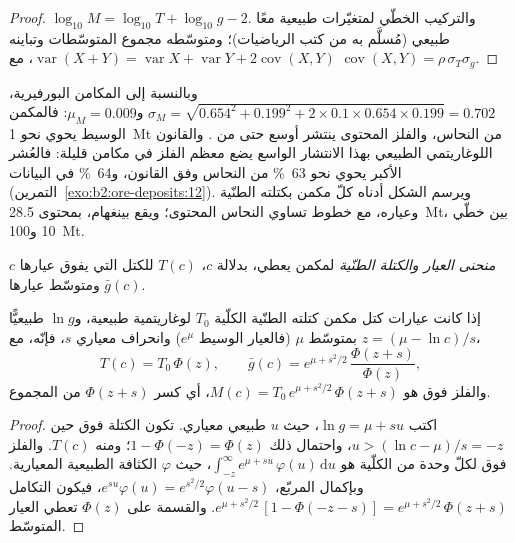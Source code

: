 \begin{proof}
$\log_{10} M = \log_{10} T + \log_{10} g - 2$. والتركيب الخطّي لمتغيّرات طبيعية معًا
طبيعي (مُسلَّم به من كتب الرياضيات)؛ ومتوسّطه مجموع المتوسّطات وتباينه
$\operatorname{var}(X + Y) = \operatorname{var} X + \operatorname{var} Y + 2\operatorname{cov}(X, Y)$،
مع $\operatorname{cov}(X, Y) = \rho\,\sigma_T\sigma_g$.
\end{proof}

وبالنسبة إلى المكامن البورفيرية، $\sigma_M = \sqrt{0.654^2 + 0.199^2 + 2 \times 0.1 \times 0.654 \times
0.199} = 0.702$ و\mbox{$\mu_M = 0.009$}: فالمكمن الوسيط يحوي نحو \qty{1}{Mt} من النحاس،
والفلز المحتوى ينتشر أوسع حتى من . والقانون اللوغاريتمي الطبيعي بهذا الانتشار الواسع
يضع معظم الفلز في مكامن قليلة: فالعُشر الأكبر يحوي نحو \qty{63}{\percent} من
النحاس وفق القانون، و\qty{64}{\percent} في البيانات (التمرين~\ref{exo:b2:ore-deposits:12}). ويرسم
الشكل أدناه كلّ مكمن بكتلته الطنّية وعياره، مع خطوط تساوي النحاس المحتوى؛
ويقع بينغهام، بمحتوى \qty{28.5}{Mt}، بين خطّي 10 و\qty{100}{Mt}.

\begin{definition}\label{def:b2:ore-deposits:gt}
\emph{منحنى العيار والكتلة الطنّية} لمكمن يعطي، بدلالة
 $c$،  $T(c)$ للكتل التي يفوق عيارها $c$ ومتوسّط عيارها
$\bar g(c)$.
\end{definition}

\begin{proposition}\label{prop:b2:ore-deposits:gt}
إذا كانت عيارات كتل مكمن كتلته الطنّية الكلّية $T_0$ لوغاريتمية طبيعية، و$\ln g$ طبيعيًّا
بمتوسّط $\mu$ (فالعيار الوسيط $e^{\mu}$) وانحراف معياري $s$، فإنّه، مع $z = (\mu -
\ln c)/s$،
\begin{equation}
T(c) = T_0\,\Phi(z), \qquad
\bar g(c) = e^{\mu + s^2/2}\,\frac{\Phi(z + s)}{\Phi(z)} ,
\label{eq:b2:ore-deposits:gt}
\end{equation}
والفلز فوق  هو $M(c) = T_0\,e^{\mu + s^2/2}\,\Phi(z + s)$، أي كسر $\Phi(z +
s)$ من المجموع.
\end{proposition}

\begin{proof}
اكتب $\ln g = \mu + s u$، حيث $u$ طبيعي معياري. تكون الكتلة فوق  حين $u > (\ln c -
\mu)/s = -z$، واحتمال ذلك $1 - \Phi(-z) = \Phi(z)$؛ ومنه $T(c)$. والفلز فوق
 لكلّ وحدة من  الكلّية هو $\int_{-z}^{\infty} e^{\mu + s u}\,\varphi(u)\,\mathrm{d}u$،
حيث $\varphi$ الكثافة الطبيعية المعيارية. وبإكمال المربّع، $e^{su}\varphi(u) =
e^{s^2/2}\varphi(u - s)$، فيكون التكامل $e^{\mu + s^2/2}\,[1 - \Phi(-z - s)] = e^{\mu +
s^2/2}\,\Phi(z + s)$. والقسمة على $\Phi(z)$ تعطي العيار المتوسّط.
\end{proof}

